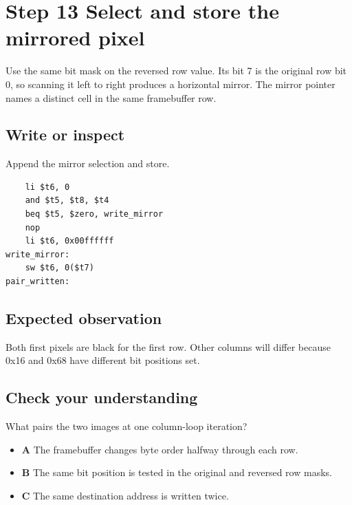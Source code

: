 \section{Step 13 Select and store the mirrored
  pixel}\label{003-eight-byte-sprite-s13-step-13-select-and-store-the-mirrored-pixel}

Use the same bit mask on the reversed row value. Its bit 7 is the
original row bit 0, so scanning it left to right produces a horizontal
mirror. The mirror pointer names a distinct cell in the same framebuffer
row.

\subsection{Write or
  inspect}\label{003-eight-byte-sprite-s13-write-or-inspect}

Append the mirror selection and store.

\begin{verbatim}
    li $t6, 0
    and $t5, $t8, $t4
    beq $t5, $zero, write_mirror
    nop
    li $t6, 0x00ffffff
write_mirror:
    sw $t6, 0($t7)
pair_written:
\end{verbatim}

\subsection{Expected
  observation}\label{003-eight-byte-sprite-s13-expected-observation}

Both first pixels are black for the first row. Other columns will differ
because 0x16 and 0x68 have different bit positions set.

\subsection{Check your
  understanding}\label{003-eight-byte-sprite-s13-check-your-understanding}

What pairs the two images at one column-loop iteration?

\begin{itemize}
  \tightlist
  \item
        \textbf{A} The framebuffer changes byte order halfway through each
        row.
  \item
        \textbf{B} The same bit position is tested in the original and
        reversed row masks.
  \item
        \textbf{C} The same destination address is written twice.
\end{itemize}
